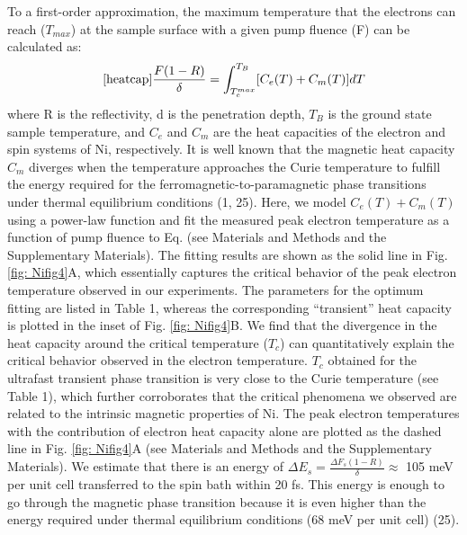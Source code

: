 To a first-order approximation, the maximum temperature that the electrons can reach ($T_{max}$) at the sample surface with a given pump fluence (F) can be calculated as:
\begin{equation}
\ref{heatcap}
\frac{F(1-R)}{\delta}=\int_{T_{e}^{max}}^{T_{B}}[C_{e}(T)+C_{m}(T)]dT
\label{eqn: 1}
\end{equation}
where R is the reflectivity, d is the penetration depth, $T_{B}$ is the ground state sample temperature, and $C_{e}$ and $C_{m}$ are the heat capacities of the electron and spin systems of Ni, respectively. It is well known that the magnetic heat capacity $C_{m}$ diverges when the temperature approaches the Curie temperature to fulfill the energy required for the ferromagnetic-to-paramagnetic phase transitions under thermal equilibrium conditions (1, 25). Here, we model $C_{e}(T)+C_{m}(T)$ using a power-law function and fit the measured peak electron temperature as a function of pump fluence to Eq.  (see Materials and Methods and the Supplementary Materials). The fitting results are shown as the solid line in Fig. \ref{fig: Nifig4}A, which essentially captures the critical behavior of the peak electron temperature observed in our experiments. The parameters for the optimum fitting are listed in Table 1, whereas the corresponding “transient” heat capacity is plotted in the inset of Fig. \ref{fig: Nifig4}B. We find that the divergence in the heat capacity around the critical temperature ($T_{c}$) can quantitatively explain the critical behavior observed in the electron temperature. $T_{c}$ obtained for the ultrafast transient phase transition is very close to the Curie temperature (see Table 1), which further corroborates that the critical phenomena we observed are related to the intrinsic magnetic properties of Ni. The peak electron temperatures with the contribution of electron heat capacity alone are plotted as the dashed line in Fig. \ref{fig: Nifig4}A (see Materials and Methods and the Supplementary Materials). We estimate that there is an energy of $\Delta E_{s}=\frac{\Delta F_{s}(1-R)}{\delta}\approx$ 105 meV per unit cell transferred to the spin bath within 20 fs. This energy is enough to go through the magnetic phase transition because it is even higher than the energy required under thermal equilibrium conditions (68 meV per unit cell) (25).

